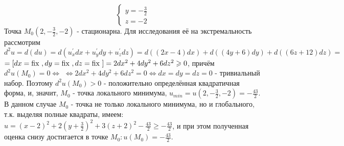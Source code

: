 \begin{examples}
\begin{equation*}
\begin{cases}
            y = -\frac{3}{2} \\
            z = -2
            \end{cases}
        \end{equation*}
        Точка $M_0 (2, -\frac{3}{2}, -2)$ - стационарна. Для исследования её на экстремальность рассмотрим $d^2 u = d(du) = d(u^{'}_x dx + u^{'}_y dy + u^{'}_z dz) = d((2x-4)dx) + d((4y+6)dy) + d((6z+12)dz) = $ 
        $= [dx = \operatorname{\text{fix }}, dy = \operatorname{\text{fix }}, dz = \operatorname{\text{fix }}] = 2 dx^2 + 4dy^2 + 6 dz^2 \geqslant 0$, причём $d^2 u (M_0) = 0 \Leftrightarrow$ 
        $ \Leftrightarrow 2dx^2 + 4dy^2 + 6dz^2 = 0 \Leftrightarrow dx = dy = dz = 0$ - тривиальный набор. Поэтому $d^2 u (M_0) > 0$ - положительно определённая квадратичная форма, и, значит, $M_0$ - точка локального минимума, $u_{min} = u(2, -\frac{3}{2}, -2) = -\frac{43}{2}$. В данном случае $M_0$ - точка не только локального минимума, но и глобального, т.к. выделяя полные квадраты, имеем: $u = (x-2)^2 + 2 (y+\frac{3}{2})^2 + 3(z+2)^2 - \frac{43}{2} \geqslant - \frac{43}{2}$, и при этом полученная оценка снизу достигается в точке $M_0: u(M_0) = -\frac{43}{2}$.
\end{examples}

$  $\newpage $  $